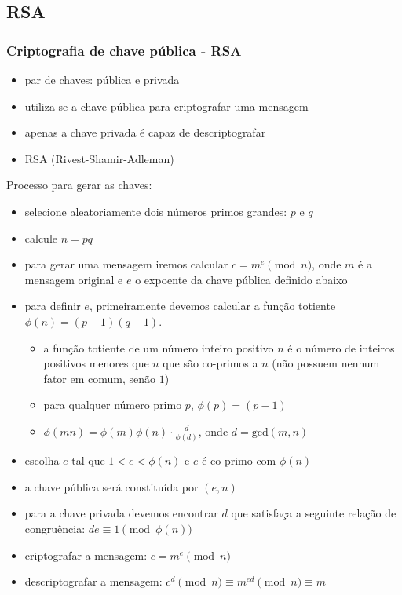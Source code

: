 \subsection{RSA}
\begin{frame}
\frametitle{Criptografia de chave pública - RSA}
\begin{itemize}
\item par de chaves: pública e privada
\item utiliza-se a chave pública para criptografar uma mensagem
\item apenas a chave privada é capaz de descriptografar
\item RSA (Rivest-Shamir-Adleman) 
\end{itemize}

\framebreak

Processo para gerar as chaves:
\begin{itemize}
\item selecione aleatoriamente dois números primos grandes: $p$ e $q$
\item calcule $n = pq$
\item para gerar uma mensagem iremos calcular $c = m^e \pmod{n}$, onde
$m$ é a mensagem original e $e$ o expoente da chave pública definido abaixo
\item para definir $e$, primeiramente devemos calcular a função totiente $\phi(n) = (p-1)(q-1)$.
     \begin{itemize}
     \item a função totiente de um número inteiro positivo $n$ é o número de inteiros positivos menores que $n$ que são co-primos a $n$ 
     (não possuem nenhum fator em comum, senão $1$)
     \item para qualquer número primo $p$, $\phi(p) = (p-1)$
     \item $\phi(mn) = \phi(m) \phi(n) \cdot \frac{d}{\phi(d)}$, onde $d = \text{gcd}(m,n)$
     \end{itemize}
\item escolha $e$ tal que $1 < e < \phi(n)$ e $e$ é co-primo com $\phi(n)$
\item a chave pública será constituída por $(e,n)$
\item para a chave privada devemos encontrar $d$ que satisfaça a seguinte relação de congruência: $de \equiv 1 \pmod{\phi(n)}$
\item criptografar a mensagem: $c = m^e \pmod{n}$
\item descriptografar a mensagem: $c^d \pmod n \equiv m^{ed} \pmod n \equiv m$
\end{itemize}


\end{frame}
